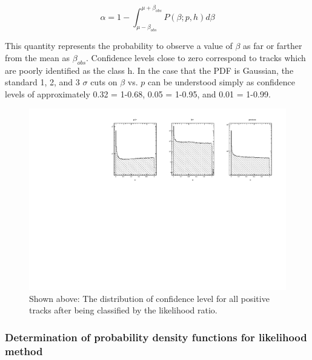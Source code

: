 \begin{equation}
  \alpha = 1 - \int_{\mu-\beta_{obs}}^{\mu+\beta_{obs}} P(\beta;p,h) d\beta
\end{equation}

This quantity represents the probability to observe a value of $\beta$ as far or farther from the mean as $\beta_{obs}$.  Confidence levels close to zero correspond to tracks which are poorly identified as the class h.  In the case that the PDF is Gaussian, the standard 1, 2, and 3 $\sigma$ cuts on $\beta$ vs. $p$ can be understood simply as confidence levels of approximately 0.32 = 1-0.68, 0.05 = 1-0.95, and 0.01 = 1-0.99.

\begin{figure}
  \begin{center}
    \includegraphics[width=16cm]{image/plots/hadron-id/confidence_level.pdf}
    \caption{ Shown above: The distribution of confidence level for all positive tracks after being classified by the likelihood ratio.}
  \end{center}
\end{figure}

\subsubsection*{Determination of probability density functions for likelihood method}

